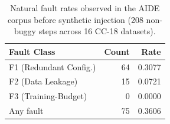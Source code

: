 \begin{table}[htbp]
\centering
\caption{Natural fault rates observed in the AIDE corpus before synthetic injection (208 non-buggy steps across 16 CC-18 datasets).}
\label{tab:natural_faults}
\small
\begin{tabular}{lrr}
\toprule
Fault Class & Count & Rate \\
\midrule
F1 (Redundant Config.) & 64 & 0.3077 \\
F2 (Data Leakage) & 15 & 0.0721 \\
F3 (Training-Budget) & 0 & 0.0000 \\
\midrule
Any fault & 75 & 0.3606 \\
\bottomrule
\end{tabular}
\end{table}